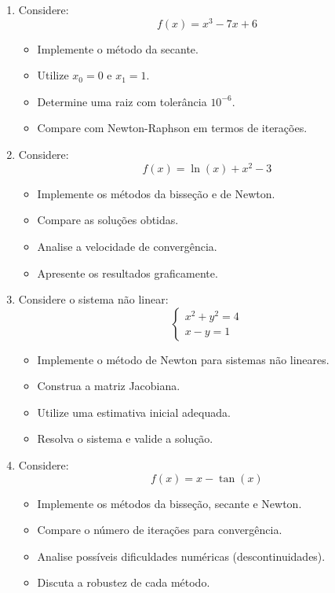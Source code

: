 \begin{enumerate}[label = \thesection.\arabic*]
\item Considere:
\[
f(x) = x^3 - 7x + 6
\]

\begin{itemize}
    \item Implemente o método da secante.
    \item Utilize $x_0 = 0$ e $x_1 = 1$.
    \item Determine uma raiz com tolerância $10^{-6}$.
    \item Compare com Newton-Raphson em termos de iterações.
\end{itemize}

\item Considere:
\[
f(x) = \ln(x) + x^2 - 3
\]

\begin{itemize}
    \item Implemente os métodos da bisseção e de Newton.
    \item Compare as soluções obtidas.
    \item Analise a velocidade de convergência.
    \item Apresente os resultados graficamente.
\end{itemize}

\item Considere o sistema não linear:
\[
\begin{cases}
x^2 + y^2 = 4 \\
x - y = 1
\end{cases}
\]

\begin{itemize}
    \item Implemente o método de Newton para sistemas não lineares.
    \item Construa a matriz Jacobiana.
    \item Utilize uma estimativa inicial adequada.
    \item Resolva o sistema e valide a solução.
\end{itemize}

\item Considere:
\[
f(x) = x - \tan(x)
\]

\begin{itemize}
    \item Implemente os métodos da bisseção, secante e Newton.
    \item Compare o número de iterações para convergência.
    \item Analise possíveis dificuldades numéricas (descontinuidades).
    \item Discuta a robustez de cada método.
\end{itemize}

\end{enumerate}